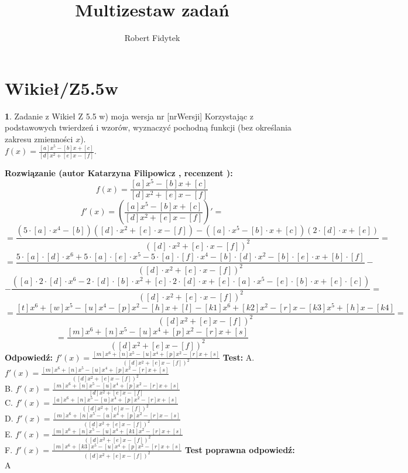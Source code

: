 \documentclass[12pt, a4paper]{article}
\title{Multizestaw zadań}
\author{Robert Fidytek}
\date{}
\theoremstyle{definition} %
\newtheorem{zad}{}
\newcommand{\kategoria}[1]{\section{#1}} %
\newcommand{\zadStart}[1]{\begin{zad}#1\newline} %
\newcommand{\zadStop}{\end{zad}}   %
\newcommand{\rozwStart}[2]{\noindent \textbf{Rozwiązanie (autor #1 , recenzent #2): }\newline} %
\newcommand{\rozwStop}{\newline}                                            %
\newcommand{\odpStart}{\noindent \textbf{Odpowiedź:}\newline}    %
\newcommand{\odpStop}{\newline}                                             %
\newcommand{\testStart}{\noindent \textbf{Test:}\newline} %
\newcommand{\testStop}{\newline} %
\newcommand{\kluczStart}{\noindent \textbf{Test poprawna odpowiedź:}\newline} %
\newcommand{\kluczStop}{\newline} %
\begin{document}
\maketitle


\kategoria{Wikieł/Z5.5w}
\zadStart{Zadanie z Wikieł Z 5.5 w) moja wersja nr [nrWersji]}
Korzystając z podstawowych twierdzeń i wzorów, wyznaczyć pochodną funkcji (bez określania zakresu zmienności $x$).\\ 
$f(x)=\frac{[a]x^5-[b]x+[c]}{[d]x^2+[e]x-[f]}$.
\zadStop
\rozwStart{Katarzyna Filipowicz}{}
$$f(x)=\frac{[a]x^5-[b]x+[c]}{[d]x^2+[e]x-[f]}$$
$$f'(x)=\left(\frac{[a]x^5-[b]x+[c]}{[d]x^2+[e]x-[f]}\right)' = $$
$$ =\frac{(5\cdot [a]\cdot x^4-[b])([d]\cdot x^2+[e]\cdot x-[f])-([a]\cdot x^5-[b]\cdot x+[c])(2\cdot [d]\cdot x+[e])}{([d]\cdot x^2+[e]\cdot x-[f])^2}=
$$ $$
=\frac{5\cdot [a]\cdot [d]\cdot x^6+5\cdot [a]\cdot [e]\cdot x^5-5\cdot [a]\cdot [f]\cdot x^4-[b]\cdot [d]\cdot x^2-[b]\cdot [e]\cdot x+[b]\cdot [f]}{([d]\cdot x^2+[e]\cdot x-[f])^2}-
$$ $$
-\frac{([a]\cdot 2\cdot [d]\cdot x^6-2\cdot[d]\cdot [b]\cdot x^2+[c]\cdot 2\cdot [d]\cdot x+[e]\cdot [a]\cdot x^5-[e]\cdot [b]\cdot x+[e]\cdot [c])}{([d]\cdot x^2+[e]\cdot x-[f])^2}=
$$ $$
=\frac{[t] x^6+[w] x^5-[u] x^4-[p] x^2-[h] x+[l]-[k1] x^6+[k2] x^2-[r] x-[k3] x^5+[h] x-[k4]}{([d]x^2+[e]x-[f])^2}=
$$ $$
=\frac{[m]x^6+[n]x^5-[u]x^4+[p]x^2-[r]x+[s]}{([d]x^2+[e]x-[f])^2}
$$
\rozwStop
\odpStart
$ f'(x)=\frac{[m]x^6+[n]x^5-[u]x^4+[p]x^2-[r]x+[s]}{([d]x^2+[e]x-[f])^2}$
\odpStop
\testStart
A. $ f'(x)=\frac{[m]x^6+[n]x^5-[u]x^4+[p]x^2-[r]x+[s]}{([d]x^2+[e]x-[f])^2}$\\
B. $ f'(x)=\frac{[m]x^6+[n]x^5-[u]x^4+[p]x^2-[r]x+[s]}{[d]x^2+[e]x-[f]}$\\
C. $ f'(x)=\frac{[a]x^6+[n]x^5-[u]x^4+[p]x^2-[r]x+[s]}{([d]x^2+[e]x-[f])^2}$ \\
D. $ f'(x)=\frac{[m]x^6+[n]x^5-[u]x^4+[p]x^2-[r]x-[s]}{([d]x^2+[e]x-[f])^2}$\\
E. $ f'(x)=\frac{[m]x^6+[n]x^5-[u]x^4+[k1]x^2-[r]x+[s]}{([d]x^2+[e]x-[f])^2}$\\
F. $ f'(x)=\frac{[m]x^6+[k3]x^5-[u]x^4+[p]x^2-[r]x+[s]}{([d]x^2+[e]x-[f])^2}$
\testStop
\kluczStart
A
\kluczStop
\end{document}
